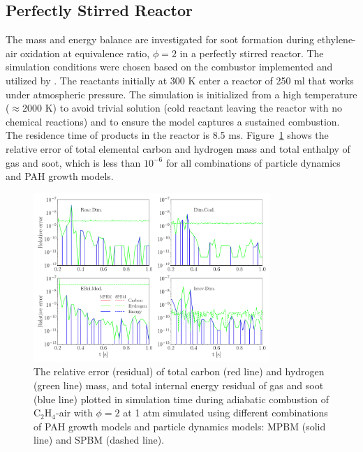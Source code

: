 \subsection{Perfectly Stirred Reactor}
\label{sec:psrvalid}
The mass and energy balance are investigated for soot formation during ethylene-air oxidation at equivalence ratio, $\phi=2$ in a perfectly stirred reactor. The simulation conditions were chosen based on the combustor implemented and utilized by \citet{stouffer2002combustion}. The reactants initially at 300 K enter a reactor of 250 ml that works under atmospheric pressure. The simulation is initialized from a high temperature ($\approx$2000 K) to avoid trivial solution (cold reactant leaving the reactor with no chemical reactions) and to ensure the model captures a sustained combustion. The residence time of products in the reactor is 8.5 ms. Figure~\ref{fig:psrvalid} shows the relative error of total elemental carbon and hydrogen mass and total enthalpy of gas and soot, which is less than $10^{-6}$ for all combinations of particle dynamics and PAH growth models.

\begin{figure}[H]
	\centering
	\includegraphics[width=0.8\textwidth]{Figures/Results/Validation/PSR/relerr_psr.pdf}
	\caption{The relative error (residual) of total carbon (red line) and hydrogen (green line) mass, and total internal energy residual of gas and soot (blue line) plotted in simulation time during adiabatic combustion of $\mathrm{C_2H_4}$-air with $\phi=2$ at 1 atm simulated using different combinations of PAH growth models and particle dynamics models: MPBM (solid line) and SPBM (dashed line).}
	\label{fig:psrvalid}
\end{figure}


